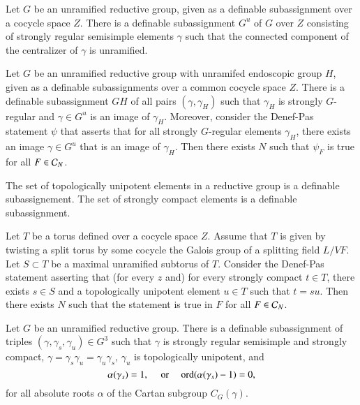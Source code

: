 \begin{lemma} 
  Let $G$ be an unramified reductive group, given as a definable
  subassignment over a cocycle space $Z$.  There is a definable
  subassignment $G^u$ of $G$ over $Z$ consisting of strongly regular
  semisimple elements $\gamma$ such that the connected component of
  the centralizer of $\gamma$ is unramified.
\end{lemma}

\begin{lemma} 
  Let $G$ be an unramified reductive group with unramifed endoscopic
  group $H$, given as a definable subassignments over a common cocycle
  space $Z$.  There is a definable subassignment $GH$ of all pairs
  $(\gamma,\gamma_H)$ such that $\gamma_H$ is strongly $G$-regular and
  $\gamma\in G^u$ is an image of $\gamma_H$.  Moreover, consider the
  Denef-Pas statement $\psi$ that asserts that for all strongly
  $G$-regular elements $\gamma_H$, there exists an image $\gamma\in
  G^u$ that is an image of $\gamma_H$.  Then there exists $N$ such
  that $\psi_F$ is true for all $F\in\mathcal C_N$.
\end{lemma}

\begin{lemma} 
  The set of topologically unipotent elements in a reductive group is
  a definable subassignement.  The set of strongly compact elements is
  a definable subassignment.
\end{lemma}

\begin{lemma} 
  Let $T$ be a torus defined over a cocycle space $Z$. Assume that $T$
  is given by twisting a split torus by some cocycle the Galois group
  of a splitting field $L/VF$.  Let $S\subset T$ be a maximal
  unramified subtorus of $T$.  Consider the Denef-Pas statement
  asserting that (for every $z$ and) for every strongly compact $t\in
  T$, there exists $s\in S$ and a topologically unipotent element
  $u\in T$ such that $t =s u$.  Then there exists $N$ such that the
  statement is true in $F$ for all $F\in \mathcal C_N$.
\end{lemma}

\begin{lemma} 
  Let $G$ be an unramified reductive group.  There is a definable
  subassignment of triples $(\gamma,\gamma_s,\gamma_u)\in G^3$ such
  that $\gamma$ is strongly regular semisimple and strongly compact,
  $\gamma = \gamma_s \gamma_u = \gamma_u\gamma_s$, $\gamma_u$ is
  topologically unipotent, and
\[
\alpha(\gamma_s)=1,
\quad\text{ or }
\quad {\operatorname{ord}}(\alpha(\gamma_s)-1)=0,
\]
for all absolute roots $\alpha$ of the Cartan subgroup $C_G(\gamma)$.
\end{lemma}

